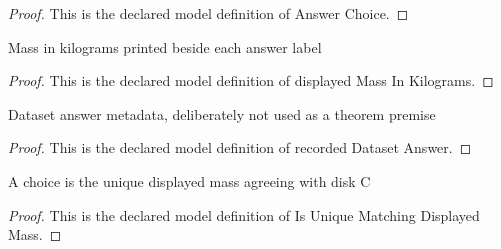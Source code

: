 \begin{proof}
  This is the declared model definition of Answer Choice.
\end{proof}
\begin{definition}
  \label{def:physics:phyx-mini-0757:phyxminiproblems-problemphyxmini0757-displayedmassinkilograms}
  Mass in kilograms printed beside each answer label
\end{definition}
\begin{proof}
  This is the declared model definition of displayed Mass In Kilograms.
\end{proof}
\begin{definition}
  \label{def:physics:phyx-mini-0757:phyxminiproblems-problemphyxmini0757-recordeddatasetanswer}
  Dataset answer metadata, deliberately not used as a theorem premise
\end{definition}
\begin{proof}
  This is the declared model definition of recorded Dataset Answer.
\end{proof}
\begin{definition}
  \label{def:physics:phyx-mini-0757:phyxminiproblems-problemphyxmini0757-isuniquematchingdisplayedmass}
  A choice is the unique displayed mass agreeing with disk C
\end{definition}
\begin{proof}
  This is the declared model definition of Is Unique Matching Displayed Mass.
\end{proof}
